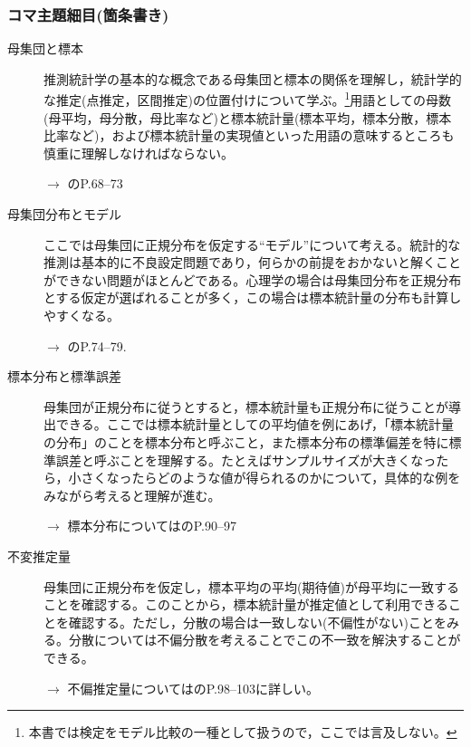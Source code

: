 \subsubsection{コマ主題細目(箇条書き)}
\begin{description}
\item[母集団と標本]推測統計学の基本的な概念である母集団と標本の関係を理解し，統計学的な推定(点推定，区間推定)の位置付けについて学ぶ。\footnote{本書では検定をモデル比較の一種として扱うので，ここでは言及しない。}用語としての母数(母平均，母分散，母比率など)と標本統計量(標本平均，標本分散，標本比率など)，および標本統計量の実現値といった用語の意味するところも慎重に理解しなければならない。
    \begin{flushright}
        $\to$ \citet{Yamada2004}のP.68--73
    \end{flushright}

\item[母集団分布とモデル]ここでは母集団に正規分布を仮定する``モデル''について考える。統計的な推測は基本的に不良設定問題であり，何らかの前提をおかないと解くことができない問題がほとんどである。心理学の場合は母集団分布を正規分布とする仮定が選ばれることが多く，この場合は標本統計量の分布も計算しやすくなる。
\begin{flushright}
    $\to$ \citet{Yamada2004}のP.74--79.
\end{flushright}

\item[標本分布と標準誤差]母集団が正規分布に従うとすると，標本統計量も正規分布に従うことが導出できる。ここでは標本統計量としての平均値を例にあげ，「標本統計量の分布」のことを標本分布と呼ぶこと，また標本分布の標準偏差を特に標準誤差と呼ぶことを理解する。たとえばサンプルサイズが大きくなったら，小さくなったらどのような値が得られるのかについて，具体的な例をみながら考えると理解が進む。
\begin{flushright}
    $\to$ 標本分布については\citet{Yamada2004}のP.90--97
\end{flushright}

\item[不変推定量]母集団に正規分布を仮定し，標本平均の平均(期待値)が母平均に一致することを確認する。このことから，標本統計量が推定値として利用できることを確認する。ただし，分散の場合は一致しない(不偏性がない)ことをみる。分散については不偏分散を考えることでこの不一致を解決することができる。
\begin{flushright}
    $\to$ 不偏推定量については\citet{Yamada2004}のP.98--103に詳しい。
\end{flushright}

\end{description}
